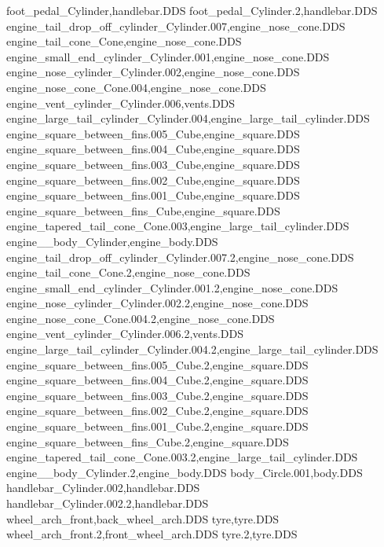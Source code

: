 foot_pedal_Cylinder,handlebar.DDS
foot_pedal_Cylinder.2,handlebar.DDS
engine_tail_drop_off_cylinder_Cylinder.007,engine_nose_cone.DDS
engine_tail_cone_Cone,engine_nose_cone.DDS
engine_small_end_cylinder_Cylinder.001,engine_nose_cone.DDS
engine_nose_cylinder_Cylinder.002,engine_nose_cone.DDS
engine_nose_cone_Cone.004,engine_nose_cone.DDS
engine_vent_cylinder_Cylinder.006,vents.DDS
engine_large_tail_cylinder_Cylinder.004,engine_large_tail_cylinder.DDS
engine_square_between_fins.005_Cube,engine_square.DDS
engine_square_between_fins.004_Cube,engine_square.DDS
engine_square_between_fins.003_Cube,engine_square.DDS
engine_square_between_fins.002_Cube,engine_square.DDS
engine_square_between_fins.001_Cube,engine_square.DDS
engine_square_between_fins_Cube,engine_square.DDS
engine_tapered_tail_cone_Cone.003,engine_large_tail_cylinder.DDS
engine__body_Cylinder,engine_body.DDS
engine_tail_drop_off_cylinder_Cylinder.007.2,engine_nose_cone.DDS
engine_tail_cone_Cone.2,engine_nose_cone.DDS
engine_small_end_cylinder_Cylinder.001.2,engine_nose_cone.DDS
engine_nose_cylinder_Cylinder.002.2,engine_nose_cone.DDS
engine_nose_cone_Cone.004.2,engine_nose_cone.DDS
engine_vent_cylinder_Cylinder.006.2,vents.DDS
engine_large_tail_cylinder_Cylinder.004.2,engine_large_tail_cylinder.DDS
engine_square_between_fins.005_Cube.2,engine_square.DDS
engine_square_between_fins.004_Cube.2,engine_square.DDS
engine_square_between_fins.003_Cube.2,engine_square.DDS
engine_square_between_fins.002_Cube.2,engine_square.DDS
engine_square_between_fins.001_Cube.2,engine_square.DDS
engine_square_between_fins_Cube.2,engine_square.DDS
engine_tapered_tail_cone_Cone.003.2,engine_large_tail_cylinder.DDS
engine__body_Cylinder.2,engine_body.DDS
body_Circle.001,body.DDS
handlebar_Cylinder.002,handlebar.DDS
handlebar_Cylinder.002.2,handlebar.DDS
wheel_arch_front,back_wheel_arch.DDS
tyre,tyre.DDS
wheel_arch_front.2,front_wheel_arch.DDS
tyre.2,tyre.DDS
